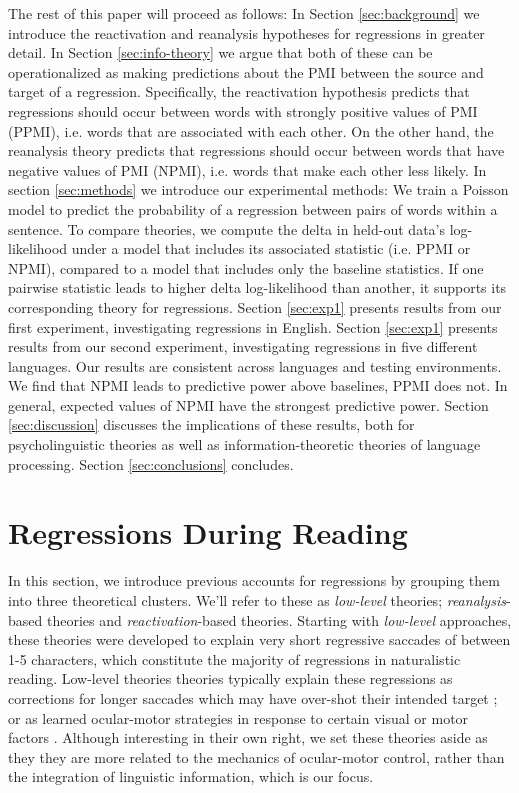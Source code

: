 \documentclass[12pt]{article}
\begin{document}
The rest of this paper will proceed as follows: In Section \ref{sec:background} we introduce the reactivation and reanalysis hypotheses for regressions in greater detail. In Section \ref{sec:info-theory} we argue that both of these can be operationalized as making predictions about the PMI between the source and target of a regression. Specifically, the reactivation hypothesis predicts that regressions should occur between words with strongly positive values of PMI (PPMI), i.e. words that are associated with each other. On the other hand, the reanalysis theory predicts that regressions should occur between words that have negative values of PMI (NPMI),  i.e. words that make each other less likely. In section \ref{sec:methods} we introduce our experimental methods: We train a Poisson model to predict the probability of a regression between pairs of words within a sentence. To compare theories, we compute the delta in held-out data's log-likelihood  under a model that includes its associated statistic (i.e. PPMI or NPMI), compared to a model that includes only the baseline statistics. If one pairwise statistic leads to higher delta log-likelihood than another, it supports its corresponding theory for regressions. Section \ref{sec:exp1} presents results from our first experiment, investigating regressions in English. Section \ref{sec:exp1} presents results from our second experiment, investigating regressions in five different languages. Our results are consistent across languages and testing environments. We find that NPMI leads to predictive power above baselines, PPMI does not. In general, expected values of NPMI have the strongest predictive power. Section \ref{sec:discussion} discusses the implications of these results, both for psycholinguistic theories as well as information-theoretic theories of language processing. Section \ref{sec:conclusions} concludes.



\section{Regressions During Reading}

In this section, we introduce previous accounts for regressions by grouping them into three theoretical clusters. We'll refer to these as \emph{low-level} theories; \emph{reanalysis}-based theories and \emph{reactivation}-based theories. Starting with \textit{low-level} approaches, these theories were developed to explain very short regressive saccades of between 1-5 characters, which constitute the majority of regressions in naturalistic reading. Low-level theories theories typically explain these regressions as corrections for longer saccades which may have over-shot their intended target \citep{inhoff2019regressions}; or as learned ocular-motor strategies in response to certain visual or motor factors \citep{o1987eye, yang2001eye}. Although interesting in their own right, we set these theories aside as they they are more related to the mechanics of ocular-motor control, rather than the integration of linguistic information, which is our focus.
\end{document}
